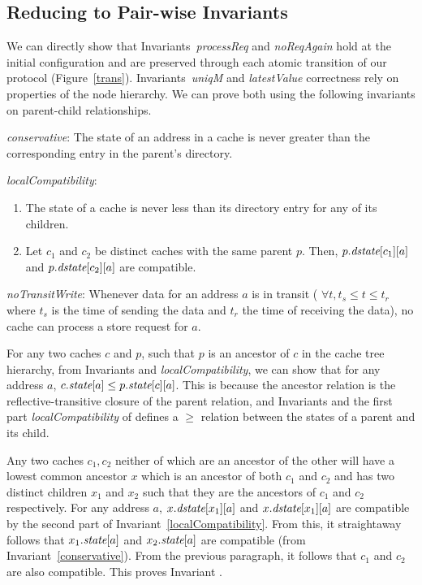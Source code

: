 \subsection{Reducing to Pair-wise Invariants}
\label{pairwise}

We can directly show that Invariants~\textit{processReq} and
\textit{noReqAgain} hold at the initial configuration and are
preserved through each atomic transition of our protocol
(Figure~\ref{trans}). Invariants~\textit{uniqM} and
\textit{latestValue} correctness rely on properties of the node
hierarchy. We can prove both using the following invariants on
parent-child relationships.

\begin{inv}
\textit{conservative}: The state of an address in a cache is never greater than
the corresponding entry in the parent's directory.
\label{conservative}
\end{inv}

\begin{inv}
\textit{localCompatibility}:
\begin{enumerate}
\item The state of a cache is never less than its directory entry for any of
its children.
\item Let $c_1$ and $c_2$ be distinct caches with the same parent $p$. Then,
$p.\textit{dstate}[c_1][a]$ and $p.\textit{dstate}[c_2][a]$ are compatible.
\end{enumerate}
\label{localCompatibility}
\end{inv}

\begin{inv}
\textit{noTransitWrite}: Whenever data for an address $a$ is in transit (\ie{}
$\forall t, t_s \le t \le t_r$ where $t_s$ is the time of sending the data and
$t_r$ the time of receiving the data), no cache can process a store request for
$a$.
\label{noTransitWrite}
\end{inv}

For any two caches $c$ and $p$, such that $p$ is an ancestor of $c$ in
the cache tree hierarchy, from Invariants  and
\textit{localCompatibility}, we can show that for any address $a$,
$c.\textit{state}[a] \le p.\textit{state}[c][a]$. This is because the ancestor
relation is the reflective-transitive closure of the parent relation,
and Invariants  and the first part
\textit{localCompatibility} of defines a $\ge$ relation between the
states of a parent and its child.

Any two caches $c_1, c_2$ neither of which are an ancestor of the
other will have a lowest common ancestor $x$ which is an ancestor of
both $c_1$ and $c_2$ and has two distinct children $x_1$ and $x_2$
such that they are the ancestors of $c_1$ and $c_2$ respectively. For
any address $a$, $x.\textit{dstate}[x_1][a]$ and $x.\textit{dstate}[x_1][a]$ are
compatible by the second part of
Invariant~\ref{localCompatibility}. From this, it straightaway follows
that $x_1.\textit{state}[a]$ and $x_2.\textit{state}[a]$ are compatible (from
Invariant~\ref{conservative}). From the previous paragraph, it follows
that $c_1$ and $c_2$ are also compatible. This proves
Invariant .

